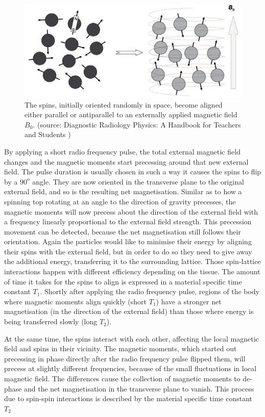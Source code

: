 \begin{figure}[h!]
\centering
\includegraphics[width=0.8\linewidth]{../fig/intro/spin_align}
\caption{The spins, initially oriented randomly in space, become aligned either parallel or antiparallel to an externally applied magnetic field $B_0$. (source: Diagnostic Radiology Physics: A Handbook for Teachers and Students \cite{Maidment2014})}
\label{fig:spin_align}
\end{figure}

By applying a short radio frequency pulse, the total external magnetic field changes and the magnetic moments start precessing around that new external field.
The pulse duration is usually chosen in such a way it causes the spins to flip by a $90^o$ angle.
They are now oriented in the transverse plane to the original external field, and so is the resulting net magnetisation.
Similar as to how a spinning top rotating at an angle to the direction of gravity precesses, the magnetic moments will now precess about the direction of the external field with a frequency linearly proportional to the external field strength.
This precession movement can be detected, because the net magnetisation still follows their orientation. 
Again the particles would like to minimise their energy by aligning their spins with the external field, but in order to do so they need to give away the additional energy, transferring it to the surrounding lattice.
Those spin-lattice interactions happen with different efficiency depending on the tissue.
The amount of time it takes for the spins to align is expressed in a material specific time constant $T_1$.
Shortly after applying the radio frequency pulse, regions of the body where magnetic moments align quickly (short $T_1$) have a stronger net magnetisation (in the direction of the external field) than those where energy is being transferred slowly (long $T_2$).

At the same time, the spins interact with each other, affecting the local magnetic field and spins in their vicinity.
The magnetic moments, which started out precessing in phase directly after the radio frequency pulse flipped them, will precess at slightly different frequencies, because of the small fluctuations in local magnetic field.
The differences cause the collection of magnetic moments to de-phase and the net magnetisation in the transverse plane to vanish.
This process due to spin-spin interactions is described by the material specific time constant $T_2$

